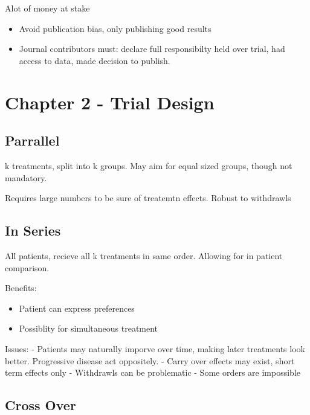 \documentclass[
  letterpaper,
  DIV=11,
  numbers=noendperiod]{scrreprt}
\providecommand{\tightlist}{%
  \setlength{\itemsep}{0pt}\setlength{\parskip}{0pt}}\usepackage{longtable,booktabs,array}
\begin{document}
Alot of money at stake

\begin{itemize}
\tightlist
\item
  Avoid publication bias, only publishing good results
\item
  Journal contributors must: declare full responsibilty held over trial,
  had access to data, made decision to publish.
\end{itemize}


\hypertarget{chapter-2---trial-design}{%
\chapter{Chapter 2 - Trial Design}\label{chapter-2---trial-design}}

\hypertarget{parrallel}{%
\section{Parrallel}\label{parrallel}}

k treatments, split into k groups. May aim for equal sized groups,
though not mandatory.

Requires large numbers to be sure of treatemtn effects. Robust to
withdrawls

\hypertarget{in-series}{%
\section{In Series}\label{in-series}}

All patients, recieve all k treatments in same order. Allowing for in
patient comparison.

Benefits:

\begin{itemize}
\tightlist
\item
  Patient can express preferences
\item
  Possiblity for simultaneous treatment
\end{itemize}

Issues: - Patients may naturally imporve over time, making later
treatments look better. Progressive disease act oppositely. - Carry over
effects may exist, short term effects only - Withdrawls can be
problematic - Some orders are impossible

\hypertarget{cross-over}{%
\section{Cross Over}\label{cross-over}}
\end{document}
